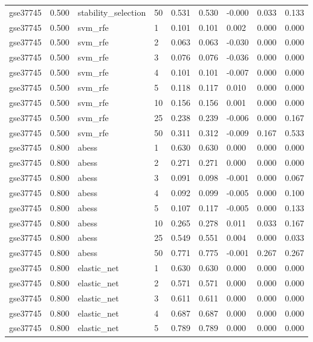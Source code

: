 \begin{table}[t]
\begin{tabular}{lllllllll}
    gse37745 & 0.500 & stability\_selection & 50 & 0.531 & 0.530 & -0.000 & 0.033 & 0.133 \\
    gse37745 & 0.500 & svm\_rfe & 1 & 0.101 & 0.101 & 0.002 & 0.000 & 0.000 \\
    gse37745 & 0.500 & svm\_rfe & 2 & 0.063 & 0.063 & -0.030 & 0.000 & 0.000 \\
    gse37745 & 0.500 & svm\_rfe & 3 & 0.076 & 0.076 & -0.036 & 0.000 & 0.000 \\
    gse37745 & 0.500 & svm\_rfe & 4 & 0.101 & 0.101 & -0.007 & 0.000 & 0.000 \\
    gse37745 & 0.500 & svm\_rfe & 5 & 0.118 & 0.117 & 0.010 & 0.000 & 0.000 \\
    gse37745 & 0.500 & svm\_rfe & 10 & 0.156 & 0.156 & 0.001 & 0.000 & 0.000 \\
    gse37745 & 0.500 & svm\_rfe & 25 & 0.238 & 0.239 & -0.006 & 0.000 & 0.167 \\
    gse37745 & 0.500 & svm\_rfe & 50 & 0.311 & 0.312 & -0.009 & 0.167 & 0.533 \\
    gse37745 & 0.800 & abess & 1 & 0.630 & 0.630 & 0.000 & 0.000 & 0.000 \\
    gse37745 & 0.800 & abess & 2 & 0.271 & 0.271 & 0.000 & 0.000 & 0.000 \\
    gse37745 & 0.800 & abess & 3 & 0.091 & 0.098 & -0.001 & 0.000 & 0.067 \\
    gse37745 & 0.800 & abess & 4 & 0.092 & 0.099 & -0.005 & 0.000 & 0.100 \\
    gse37745 & 0.800 & abess & 5 & 0.107 & 0.117 & -0.005 & 0.000 & 0.133 \\
    gse37745 & 0.800 & abess & 10 & 0.265 & 0.278 & 0.011 & 0.033 & 0.167 \\
    gse37745 & 0.800 & abess & 25 & 0.549 & 0.551 & 0.004 & 0.000 & 0.033 \\
    gse37745 & 0.800 & abess & 50 & 0.771 & 0.775 & -0.001 & 0.267 & 0.267 \\
    gse37745 & 0.800 & elastic\_net & 1 & 0.630 & 0.630 & 0.000 & 0.000 & 0.000 \\
    gse37745 & 0.800 & elastic\_net & 2 & 0.571 & 0.571 & 0.000 & 0.000 & 0.000 \\
    gse37745 & 0.800 & elastic\_net & 3 & 0.611 & 0.611 & 0.000 & 0.000 & 0.000 \\
    gse37745 & 0.800 & elastic\_net & 4 & 0.687 & 0.687 & 0.000 & 0.000 & 0.000 \\
    gse37745 & 0.800 & elastic\_net & 5 & 0.789 & 0.789 & 0.000 & 0.000 & 0.000 \\

\end{tabular}
\end{table}
